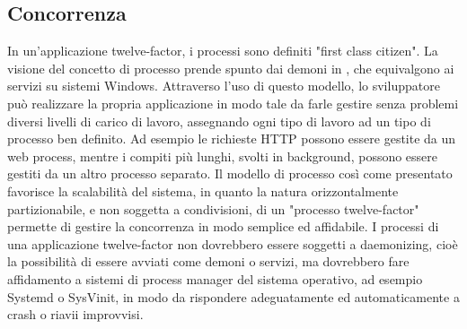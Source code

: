\documentclass[PianoDiQualifica.tex]{subfiles}
\begin{document}
\subsection{Concorrenza}
In un'applicazione twelve-factor, i processi sono definiti "first class citizen". La visione del concetto di processo prende spunto dai demoni in , che equivalgono ai servizi su sistemi Windows.
Attraverso l'uso di questo modello, lo sviluppatore può realizzare la propria applicazione in modo tale da farle gestire senza problemi diversi livelli di carico di lavoro, assegnando ogni tipo di lavoro ad un tipo di processo ben definito.
Ad esempio le richieste HTTP possono essere gestite da un web process, mentre i compiti più lunghi, svolti in background, possono essere gestiti da un altro processo separato.
Il modello di processo così come presentato favorisce la scalabilità del sistema, in quanto la natura orizzontalmente partizionabile, e non soggetta a condivisioni, di un "processo twelve-factor" permette di gestire la concorrenza in modo semplice ed affidabile. 
I processi di una applicazione twelve-factor non dovrebbero essere soggetti a daemonizing, cioè la possibilità di essere avviati come demoni o servizi, ma dovrebbero fare affidamento a sistemi di process manager del sistema operativo, ad esempio Systemd o SysVinit, in modo da rispondere adeguatamente ed automaticamente a crash o riavii improvvisi.
\end{document}
